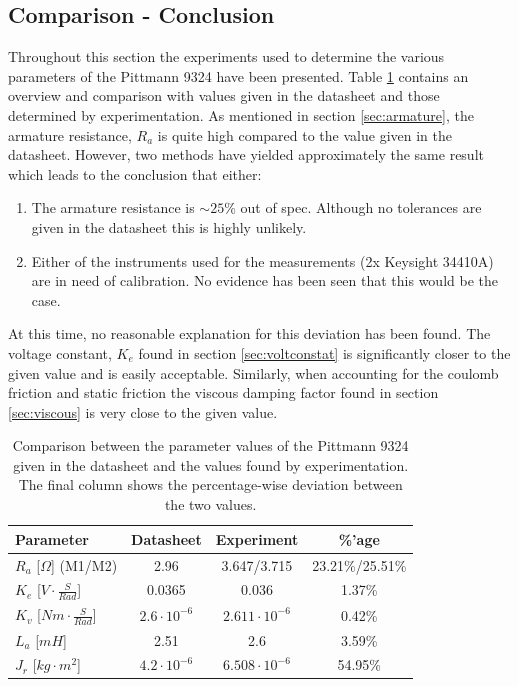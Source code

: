 \subsection{Comparison - Conclusion}
Throughout this section the experiments used to determine the various parameters of the Pittmann 9324 have been presented.
Table \ref{tab:compare} contains an overview and comparison with values given in the datasheet and those determined by experimentation.
As mentioned in section \ref{sec:armature}, the armature resistance, $R_a$ is quite high compared to the value given in the datasheet.
However, two methods have yielded approximately the same result which leads to the conclusion that either:
\begin{enumerate}
	\item The armature resistance is $\sim25$\% out of spec. 
	Although no tolerances are given in the datasheet this is highly unlikely.
	\item Either of the instruments used for the measurements (2x Keysight 34410A) are in need of calibration. 
	No evidence has been seen that this would be the case.
\end{enumerate}
At this time, no reasonable explanation for this deviation has been found.
The voltage constant, $K_e$ found in section \ref{sec:voltconstat} is significantly closer to the given value and is easily acceptable.
Similarly, when accounting for the coulomb friction and static friction the viscous damping factor found in section \ref{sec:viscous} is very close to the given value.

\begin{table}
	\centering
	\begin{tabular}{|l|c|c|c|}
		\hline
		Parameter & Datasheet & Experiment & \%'age\\
		\hline
		$R_a$ [$\Omega$] (M1/M2) & 2.96 & 3.647/3.715 & 23.21\%/25.51\%\\
		$K_e$ [$V\cdot\frac{S}{Rad}$]& 0.0365 & 0.036 & 1.37\%\\
		$K_v$ [$Nm\cdot\frac{S}{Rad}$]& $2.6\cdot10^{-6}$ & $2.611\cdot10^{-6}$ & 0.42\%\\
		$L_a$ [$mH$]& 2.51 & 2.6 & 3.59\%\\
		$J_r$ [$kg\cdot m^2$]& $4.2\cdot10^{-6}$& $6.508\cdot10^{-6}$ & 54.95\%\\
		\hline
	\end{tabular}
	\caption[Comparison of parameter values.]{Comparison between the parameter values of the Pittmann 9324 given in the datasheet and the values found by experimentation. The final column shows the percentage-wise deviation between the two values.}
	\label{tab:compare}
\end{table}
